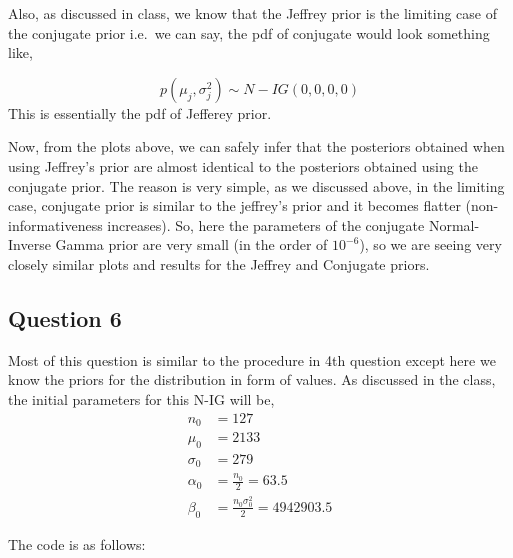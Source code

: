 \documentclass[]{article}
\begin{document}
Also, as discussed in class, we know that the Jeffrey prior is the
limiting case of the conjugate prior i.e.~we can say, the pdf of
conjugate would look something like,

\[p(\mu_j, \sigma_j^2) \sim N-IG(0,0,0,0)\] This is essentially the pdf
of Jefferey prior.

Now, from the plots above, we can safely infer that the posteriors
obtained when using Jeffrey's prior are almost identical to the
posteriors obtained using the conjugate prior. The reason is very
simple, as we discussed above, in the limiting case, conjugate prior is
similar to the jeffrey's prior and it becomes flatter
(non-informativeness increases). So, here the parameters of the
conjugate Normal-Inverse Gamma prior are very small (in the order of
\(10^{-6}\)), so we are seeing very closely similar plots and results
for the Jeffrey and Conjugate priors.

\subsection{Question 6}\label{question-6}

Most of this question is similar to the procedure in 4th question except
here we know the priors for the distribution in form of values. As
discussed in the class, the initial parameters for this N-IG will be, \[
\begin{align*}
n_0 &= 127 \\
\mu_0 &= 2133 \\
\sigma_0 &= 279 \\
\alpha_0 &= \frac{n_0}{2} = 63.5 \\
\beta_0 &= \frac{n_0 \sigma_0^2}{2} = 4942903.5
\end{align*}
\]

The code is as follows:
\end{document}
